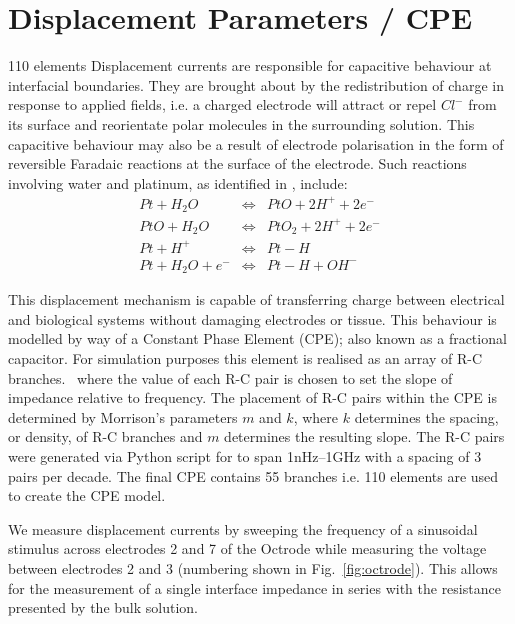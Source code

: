 \documentclass[journal, a4paper]{IEEEtran}
\begin{document}
\section{Displacement Parameters {\color{blue}/ CPE}}
\label{sect:cpe}
110 elements
Displacement currents are responsible for capacitive behaviour at interfacial boundaries.
They are brought about by the redistribution of charge in response to applied fields, i.e. a charged electrode will attract or repel $Cl^{-}$ from its surface and reorientate polar molecules in the surrounding solution.\cite{Merrill05} This capacitive behaviour may also be a result of electrode polarisation in the form of reversible Faradaic reactions at the surface of the electrode.
Such reactions involving water and platinum, as identified in \cite{Horch2004,Mohtashami2011,Merrill05}, include:
\begin{eqnarray}
    Pt + H_{2}O &\Leftrightarrow& PtO + 2 H^{+} + 2 e^{-}\\
    PtO + H_{2}O &\Leftrightarrow& PtO_{2} + 2 H^{+} + 2e^{-}\\
    Pt + H^{+} & \Leftrightarrow & Pt-H\\
    Pt + H_{2}O + e^{-} &\Leftrightarrow& Pt-H+OH^{-}
\end{eqnarray}

This displacement mechanism is capable of transferring charge between electrical and biological systems without damaging electrodes or tissue.\cite{Horch2004}
This behaviour is modelled by way of a Constant Phase Element (CPE); also known as a fractional capacitor.
For simulation purposes this element is realised as an array of R-C branches.~\cite{ScottSingle2013,Morrison59,Elwakil10} where the value of each R-C pair is chosen to set the slope of impedance relative to frequency. The placement of R-C pairs within the CPE is determined by Morrison's parameters $m$ and $k$, where $k$ determines the spacing, or density, of R-C branches and $m$ determines the resulting slope. {\color{blue} The R-C pairs were generated via Python script for to span 1\thinspace nHz--1\thinspace GHz with a spacing of 3 pairs per decade. The final CPE contains 55 branches i.e. 110 elements are used to create the CPE model.}


We measure displacement currents by sweeping the frequency of a sinusoidal stimulus across electrodes 2 and 7 of the Octrode while measuring the voltage between electrodes 2 and 3 (numbering shown in Fig.~\ref{fig:octrode}).
This allows for the measurement of a single interface impedance in series with the resistance presented by the bulk solution.
\end{document}
